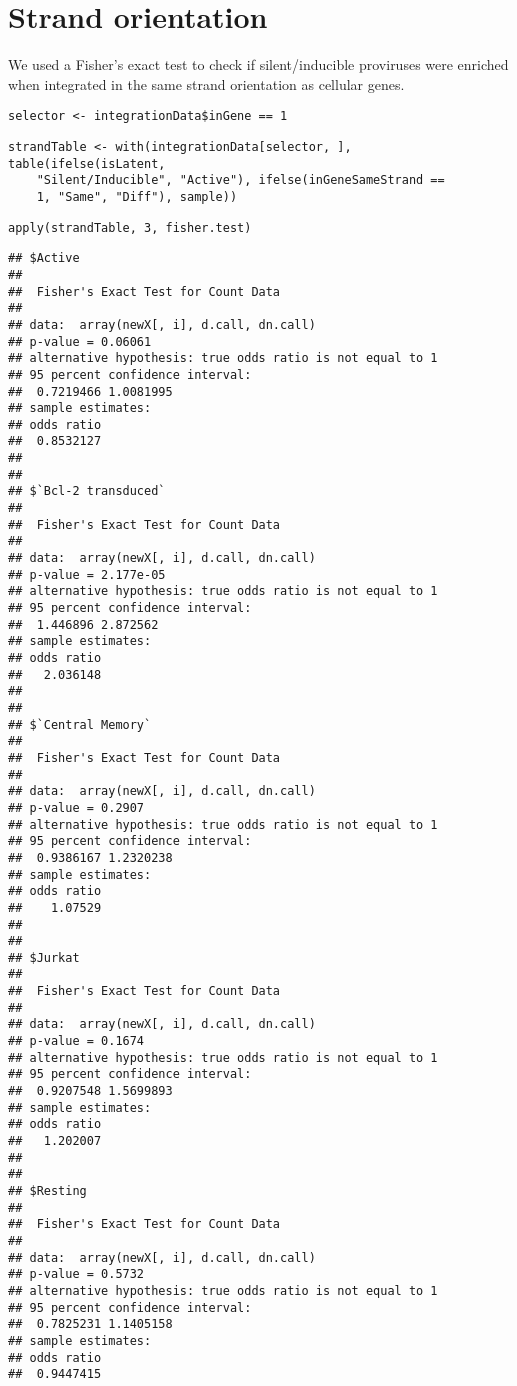 \documentclass[../../sherrill-Mix_thesis.tex]{subfiles}
\makeatletter
\newenvironment{kframe}{%
 \def\at@end@of@kframe{}%
 \ifinner\ifhmode%
  \def\at@end@of@kframe{\end{minipage}}%
  \begin{minipage}{\columnwidth}%
 \fi\fi%
 \def\FrameCommand##1{\hskip\@totalleftmargin \hskip-\fboxsep
 \colorbox{shadecolor}{##1}\hskip-\fboxsep
     \hskip-\linewidth \hskip-\@totalleftmargin \hskip\columnwidth}%
 \MakeFramed {\advance\hsize-\width
   \@totalleftmargin\z@ \linewidth\hsize
   \@setminipage}}%
 {\par\unskip\endMakeFramed%
 \at@end@of@kframe}
\newenvironment{knitrout}{}{} %
\makeatother
\begin{document}
\section{Strand orientation}
We used a Fisher's exact test to check if silent/inducible proviruses were enriched when integrated in the same strand orientation as cellular genes. 
\begin{knitrout}
\color{fgcolor}\begin{kframe}
\begin{lstlisting}[basicstyle=\ttfamily,breaklines=true]
selector <- integrationData$inGene == 1\end{lstlisting}
\begin{lstlisting}[basicstyle=\ttfamily,breaklines=true]
strandTable <- with(integrationData[selector, ], table(ifelse(isLatent, 
    "Silent/Inducible", "Active"), ifelse(inGeneSameStrand == 
    1, "Same", "Diff"), sample))\end{lstlisting}
\begin{lstlisting}[basicstyle=\ttfamily,breaklines=true]
apply(strandTable, 3, fisher.test)\end{lstlisting}
\begin{lstlisting}[basicstyle=\ttfamily,breaklines=true]
## $Active
## 
## 	Fisher's Exact Test for Count Data
## 
## data:  array(newX[, i], d.call, dn.call)
## p-value = 0.06061
## alternative hypothesis: true odds ratio is not equal to 1
## 95 percent confidence interval:
##  0.7219466 1.0081995
## sample estimates:
## odds ratio 
##  0.8532127 
## 
## 
## $`Bcl-2 transduced`
## 
## 	Fisher's Exact Test for Count Data
## 
## data:  array(newX[, i], d.call, dn.call)
## p-value = 2.177e-05
## alternative hypothesis: true odds ratio is not equal to 1
## 95 percent confidence interval:
##  1.446896 2.872562
## sample estimates:
## odds ratio 
##   2.036148 
## 
## 
## $`Central Memory`
## 
## 	Fisher's Exact Test for Count Data
## 
## data:  array(newX[, i], d.call, dn.call)
## p-value = 0.2907
## alternative hypothesis: true odds ratio is not equal to 1
## 95 percent confidence interval:
##  0.9386167 1.2320238
## sample estimates:
## odds ratio 
##    1.07529 
## 
## 
## $Jurkat
## 
## 	Fisher's Exact Test for Count Data
## 
## data:  array(newX[, i], d.call, dn.call)
## p-value = 0.1674
## alternative hypothesis: true odds ratio is not equal to 1
## 95 percent confidence interval:
##  0.9207548 1.5699893
## sample estimates:
## odds ratio 
##   1.202007 
## 
## 
## $Resting
## 
## 	Fisher's Exact Test for Count Data
## 
## data:  array(newX[, i], d.call, dn.call)
## p-value = 0.5732
## alternative hypothesis: true odds ratio is not equal to 1
## 95 percent confidence interval:
##  0.7825231 1.1405158
## sample estimates:
## odds ratio 
##  0.9447415
\end{lstlisting}
\end{kframe}
\end{knitrout}
\end{document}
